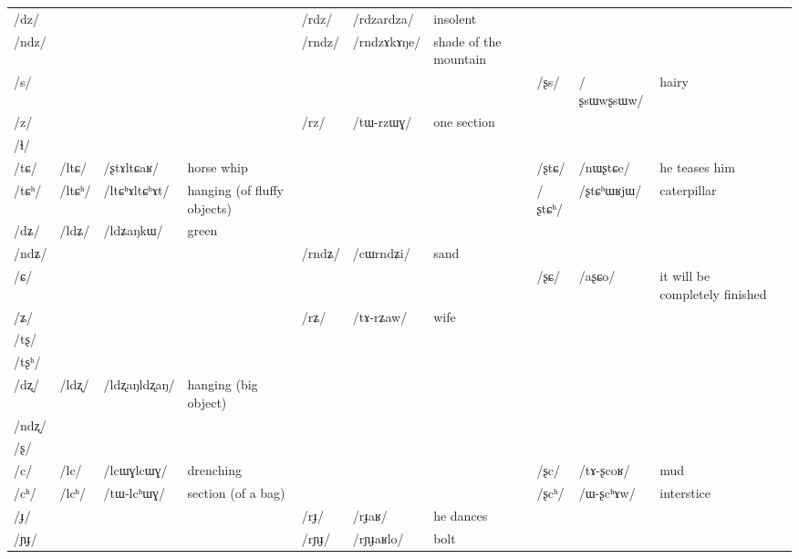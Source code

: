 \documentclass[oldfontcommands,oneside,a4paper,11pt]{article}
\newcommand{\ipa}[1]{/#1/} %
\newcommand{\tib}[1]{\cellcolor{lightgray}\textbf{#1}}
\newcommand{\idph}[1]{\cellcolor{gray}\textbf{#1}}
\begin{document}
\begin{table}
{\begin{tabular}{l|lll|lll|lll|l}
\ipa{dz}  & 	  & 	  & 	  & 	 \ipa{rdz} \idph{}  & 	 \ipa{rdzardza}  & 	 insolent & 	 & 	 & 	 & 	\\
\ipa{ndz}  & 	  & 	  & 	  & 	 \ipa{rndz}  & 	 \ipa{rndzɤkɤŋe}  & 	 shade of the mountain & 	 & 	 & 	 & 	\\
\ipa{s}  & 	  & 	  & 	  & 	 & 	 & 	 & 	 \ipa{ʂs} \idph{}  & 	 \ipa{ʂsɯwʂsɯw}  & 	 hairy & 	\\
\ipa{z}  & 	  & 	  & 	  & 	 \ipa{rz}  & 	 \ipa{tɯ-rzɯɣ}  & 	 one section & 	 & 	 & 	 & 	\\
\ipa{ɬ}  & 	  & 	  & 	  & 	  & 	  & 	  & 	 & 	 & 	 & 	\\
\ipa{tɕ}  & 	 \ipa{ltɕ}  & 	 \ipa{ʂtɤltɕaʁ}  & 	 horse whip  & 	 & 	 & 	 & 	 \ipa{ʂtɕ}  & 	 \ipa{nɯʂtɕe}  & 	he teases him  & 	\\
\ipa{tɕʰ}  & 	 \ipa{ltɕʰ} \idph{}  & 	 \ipa{ltɕʰɤltɕʰɤt}  & 	hanging (of fluffy objects)  & 	 & 	 & 	 & 	 \ipa{ʂtɕʰ}  & 	 \ipa{ʂtɕʰɯʁjɯ}  & 	caterpillar  & 	\\
\ipa{dʑ}  & 	 \ipa{ldʑ} \tib{}  & 	 \ipa{ldʑaŋkɯ}  & 	 green & 	  & 	  & 	  & 	 & 	 & 	 & 	\\
\ipa{ndʑ}  & 	  & 	  & 	  & 	 \ipa{rndʑ}  & 	 \ipa{cɯrndʑi}  & 	sand  & 	 & 	 & 	 & 	\\
\ipa{ɕ}  & 	  & 	  & 	  & 	 & 	 & 	 & 	 \ipa{ʂɕ}  & 	 \ipa{aʂɕo}  & 	 it will be completely finished  & 	\\
\ipa{ʑ}  & 	  & 	  & 	  & 	 \ipa{rʑ}  & 	 \ipa{tɤ-rʑaw}  & 	wife  & 	 & 	 & 	 & 	\\
\ipa{tʂ}  & 	  & 	  & 	  & 	  & 	  & 	  & 	 & 	 & 	 & 	\\
\ipa{tʂʰ}  & 	  & 	  & 	  & 	  & 	  & 	  & 	 & 	 & 	 & 	\\
\ipa{dʐ}  & 	 \ipa{ldʐ} \idph{}  & 	 \ipa{ldʐaŋldʐaŋ}  & 	 hanging (big object) & 	  & 	  & 	  & 	 & 	 & 	 & 	\\
\ipa{ndʐ}  & 	  & 	  & 	  & 	  & 	  & 	  & 	 & 	 & 	 & 	\\
\ipa{ʂ}  & 	  & 	  & 	  & 	  & 	  & 	  & 	 & 	 & 	 & 	\\
\ipa{c}  & 	 \ipa{lc} \idph{} & 	 \ipa{lcɯɣlcɯɣ}  & 	 drenching & 	 & 	 & 	 & 	 \ipa{ʂc}  & 	 \ipa{tɤ-ʂcoʁ}  & 	 mud & 	\\
\ipa{cʰ}  & 	 \ipa{lcʰ}  & 	 \ipa{tɯ-lcʰɯɣ}  & 	 section (of a bag) & 	 & 	 & 	 & 	 \ipa{ʂcʰ}  & 	 \ipa{ɯ-ʂcʰɤw}  & 	 interstice & 	\\
\ipa{ɟ}  & 	  & 	  & 	  & 	 \ipa{rɟ}  & 	 \ipa{rɟaʁ}  & 	he dances  & 	 & 	 & 	 & 	\\
\ipa{ɲɟ}  & 	  & 	  & 	  & 	 \ipa{rɲɟ}  & 	 \ipa{rɲɟaʁlo}  & 	 bolt & 	 & 	 & 	 & 	\\

\end{tabular}}
\end{table}
\end{document}
